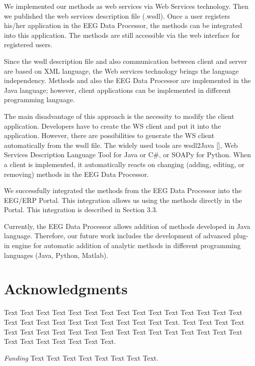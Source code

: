 \documentclass{frontiersSCNS} %
\begin{document}
We implemented our methods as web services via Web Services technology. Then we published the web services description file (.wsdl). Once a user registers his/her application in the EEG Data Processor, the methods can be integrated into this application. The methods are still accessible via the web interface for registered users.

Since the wsdl description file and also communication between client and server are based on XML language, the Web services technology brings the language independency. Methods and also the EEG Data Processor are implemented in the Java language; however, client applications can be implemented in different programming language.

The main disadvantage of this approach is the necessity to modify the client application. Developers have to create the WS client and put it into the application. However, there are possibilities to generate the WS client automatically from the wsdl file. The widely used tools are wsdl2Java [], Web Services Description Language Tool for Java or C\#, or SOAPy for Python. When a client is implemented, it automatically reacts on changing (adding, editing, or removing) methods in the EEG Data Processor.

We successfully integrated the methods from the EEG Data Processor into the EEG/ERP Portal. This integration allows us using the methods directly in the Portal. This integration is described in Section 3.3.

Currently, the EEG Data Processor allows addition of methods developed in Java language. Therefore, our future work includes the development of advanced plug-in engine for automatic addition of analytic methods in different programming languages (Java, Python, Matlab).

\section*{Acknowledgments}
Text Text Text Text Text Text  Text Text Text Text Text Text Text Text  Text Text Text Text Text Text Text Text Text  Text Text Text. Text Text Text Text Text Text  Text Text Text Text Text Text Text Text  Text Text Text Text Text Text Text Text Text  Text Text Text. 


\textit{Funding\textcolon} Text Text Text Text Text Text  Text Text.




\end{document}
